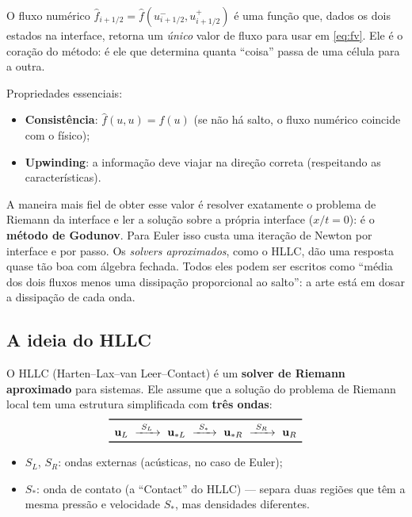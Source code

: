 \documentclass[10pt,a4paper]{article}
\newcommand{\fh}{\hat f}
\newcommand{\vu}{\mathbf{u}}
\begin{document}
O fluxo numérico $\fh_{i+1/2}=\fh(u^-_{i+1/2},u^+_{i+1/2})$ é uma função que, dados os dois estados na interface, retorna um \emph{único} valor de fluxo para usar em \eqref{eq:fv}. Ele é o coração do método: é ele que determina quanta ``coisa'' passa de uma célula para a outra.

Propriedades essenciais:
\begin{itemize}[leftmargin=2.5em,itemsep=3pt]
\item \textbf{Consistência}: $\fh(u,u)=f(u)$ (se não há salto, o fluxo numérico coincide com o físico);
\item \textbf{Upwinding}: a informação deve viajar na direção correta (respeitando as características).
\end{itemize}

A maneira mais fiel de obter esse valor é resolver exatamente o problema de Riemann da interface e ler a solução sobre a própria interface ($x/t=0$): é o \textbf{método de Godunov}. Para Euler isso custa uma iteração de Newton por interface e por passo. Os \emph{solvers aproximados}, como o HLLC, dão uma resposta quase tão boa com álgebra fechada. Todos eles podem ser escritos como ``média dos dois fluxos menos uma dissipação proporcional ao salto'': a arte está em dosar a dissipação de cada onda.

\subsection{A ideia do HLLC}

O HLLC (Harten--Lax--van Leer--Contact) é um \textbf{solver de Riemann aproximado} para sistemas. Ele assume que a solução do problema de Riemann local tem uma estrutura simplificada com \textbf{três ondas}:
\[
\begin{array}{c}
\toprule
\vu_L\ \xrightarrow{\ S_L\ }\ \vu_{*L}\ \xrightarrow{\ S_*\ }\ \vu_{*R}\ \xrightarrow{\ S_R\ }\ \vu_R\\
\bottomrule
\end{array}
\]
\begin{itemize}[leftmargin=2.5em,itemsep=3pt]
\item $S_L$, $S_R$: ondas externas (acústicas, no caso de Euler);
\item $S_*$: onda de contato (a ``Contact'' do HLLC) --- separa duas regiões que têm a mesma pressão e velocidade $S_*$, mas densidades diferentes.
\end{itemize}
\end{document}
